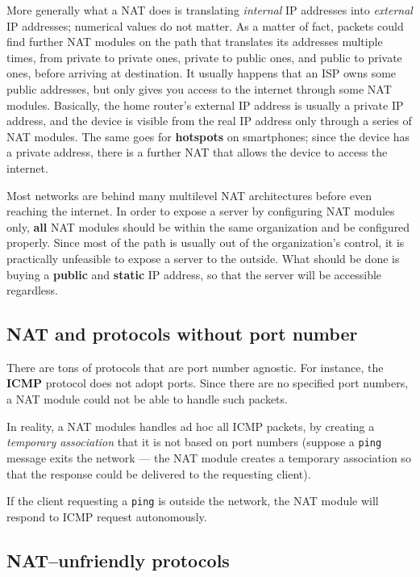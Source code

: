 \documentclass[10pt]{extreport}
\begin{document}
More generally what a NAT does is translating \emph{internal} IP addresses into
\emph{external} IP addresses; numerical values do not matter. As a matter of
fact, packets could find further NAT modules on the path that translates its
addresses multiple times, from private to private ones, private to public ones,
and public to private ones, before arriving at destination. It usually happens
that an ISP owns some public addresses, but only gives you access to the
internet through some NAT modules. Basically, the home router's external IP
address is usually a private IP address, and the device is visible from the
real IP address only through a series of NAT modules. The same goes for
\textbf{hotspots} on smartphones; since the device has a private address, there
is a further NAT that allows the device to access the internet.

Most networks are behind many multilevel NAT architectures before even reaching
the internet. In order to expose a server by configuring NAT modules only,
\textbf{all} NAT modules should be within the same organization and be
configured properly. Since most of the path is usually out of the
organization's control, it is practically unfeasible to expose a server to the
outside. What should be done is buying a \textbf{public} and \textbf{static} IP
address, so that the server will be accessible regardless.

\subsection{NAT and protocols without port number}

There are tons of protocols that are port number agnostic. For instance, the \textbf{ICMP} protocol does not adopt ports. Since there are no specified port numbers, a NAT module could not be able to handle such packets.

In reality, a NAT modules handles ad hoc all ICMP packets, by creating a
\emph{temporary association} that it is not based on port numbers (suppose a
\texttt{ping} message exits the network --- the NAT module creates a temporary
association so that the response could be delivered to the requesting client). 

If the client requesting a \texttt{ping} is outside the network, the NAT module
will respond to ICMP request autonomously.

\subsection{NAT--unfriendly protocols}
\end{document}
